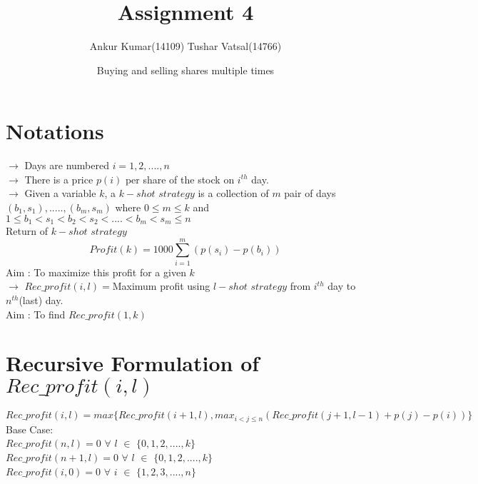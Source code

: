 \documentclass{article}
\title{Assignment 4}
\author{Ankur Kumar(14109)   Tushar Vatsal(14766) }
\date{Buying and selling shares multiple times}
\begin{document}
\maketitle

\section{Notations}
$\rightarrow$ Days are numbered $i = 1,2,....,n$\\
$\rightarrow$ There is a price $p(i)$ per share of the stock on $i^{th}$ day.\\
$\rightarrow$ Given a variable $k$, a $k-shot$ $strategy$ is a collection of $m$ pair of days $(b_1,s_1),.....,(b_m,s_m)$ where $0\leq m \leq k$ and $1 \leq b_1 < s_1 < b_2 < s_2 < .... < b_m < s_m \leq n$\\
Return of $k-shot$ $strategy$ $$Profit(k)=1000\sum_{i=1}^m (p(s_i)-p(b_i))$$ Aim : To maximize this profit for a given $k$\\
$\rightarrow$ $Rec\_profit(i,l)=$Maximum profit using $l-shot$ $strategy$ from $i^{th}$ day to $n^{th}$(last) day.\\
Aim : To find $Rec\_profit(1,k)$\\
\section{Recursive Formulation of $Rec\_profit(i,l)$}
$$Rec\_profit(i,l)=max\{Rec\_profit(i+1,l),max_{i<j\leq n}(Rec\_profit(j+1,l-1)+p(j)-p(i))\}$$Base Case:\\ $Rec\_profit(n,l)=0$ $\forall$ $l$ $\in$ $\{0,1,2,....,k\}$\\$Rec\_profit(n+1,l)=0$ $\forall$ $l$ $\in$ $\{0,1,2,....,k\}$\\ $Rec\_profit(i,0)=0$ $\forall$ $i$ $\in$ $\{1,2,3,....,n\}$\\
\end{document}
